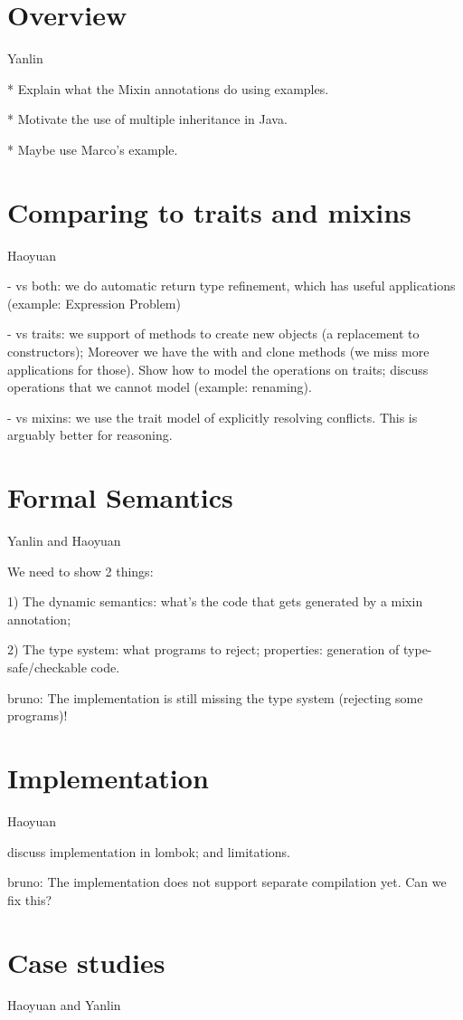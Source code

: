 \documentclass[preprint]{llncs}
\newcommand{\authornote}[3]{{\color{#2} {\sc #1}: #3}}
\newcommand\bruno[1]{\authornote{bruno}{red}{#1}}
\begin{document}
\section{Overview}\label{sec:ep}
Yanlin

* Explain what the Mixin annotations do using examples. 

* Motivate the use of multiple inheritance in Java.

* Maybe use Marco's example.

\section{Comparing to traits and mixins}
Haoyuan

   - vs both: we do automatic return type refinement, which has useful applications 
   (example: Expression Problem)

   - vs traits: we support of methods to create new objects (a replacement to constructors);
   Moreover we have the with and clone methods (we miss more applications for those). Show 
   how to model the operations on traits; discuss operations that we cannot model 
   (example: renaming).

   - vs mixins: we use the trait model of explicitly resolving conflicts. This is arguably 
   better for reasoning. 

\section{Formal Semantics}\label{sec:typesafety}
Yanlin and Haoyuan

We need to show 2 things:

1) The dynamic semantics: what's the code that gets generated by a mixin annotation;

2) The type system: what programs to reject; properties: generation of type-safe/checkable code.

\bruno{The implementation is still missing the type system (rejecting some programs)!}

\section{Implementation}
Haoyuan

discuss implementation in lombok; and limitations.

\bruno{The implementation does not support separate compilation yet. Can we fix this?}

\section{Case studies}
Haoyuan and Yanlin
\end{document}
